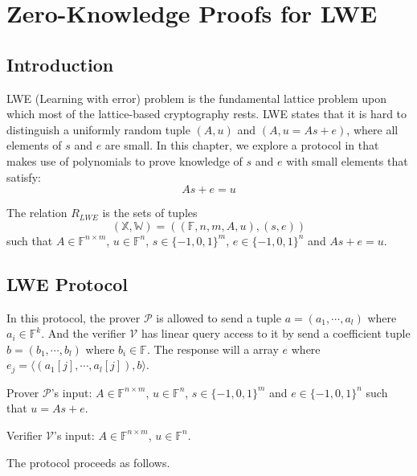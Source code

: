 \chapter{Zero-Knowledge Proofs for LWE}

\section{Introduction}

LWE (Learning with error) problem is the fundamental lattice problem upon which most of the lattice-based cryptography rests. LWE states that it is hard to distinguish a uniformly random tuple $(A, u)$ and $(A, u = As+e)$, where all elements of $s$ and $e$ are small. In this chapter, we explore a protocol in \cite{lwe} that makes use of polynomials to prove knowledge of $s$ and $e$ with small elements that satisfy:
$$
    As + e = u
$$

\begin{definition}
The relation $R_{LWE}$ is the sets of tuples
$$
    (\mathbb{X}, \mathbb{W}) = ((\mathbb{F}, n, m, A, u), (s, e))
$$ 
such that $A \in \mathbb{F}^{n \times m}$, $u \in \mathbb{F}^{n}$, $s \in \{-1, 0, 1\}^{m}$, $e \in \{-1, 0, 1\}^{n}$ and $As + e = u$.
\end{definition}

\section{LWE Protocol}

In this protocol, the prover $\mathcal{P}$ is allowed to send a tuple $a = (a_1, \cdots, a_l)$ where $a_i \in \mathbb{F}^k$. And the verifier $\mathcal{V}$ has linear query access to it by send a coefficient tuple $b = (b_1, \cdots, b_l)$ where $b_i \in \mathbb{F}$. The response will a array $e$ where $e_j = \langle (a_1[j], \cdots, a_l[j]), b  \rangle$.

Prover $\mathcal{P}$'s input: $A \in \mathbb{F}^{n \times m}$, $u \in \mathbb{F}^{n}$, $s \in \{-1, 0, 1\}^{m}$ and $e \in \{-1, 0, 1\}^{n}$ such that $u = As + e$.

Verifier $\mathcal{V}$'s input: $A \in \mathbb{F}^{n \times m}$, $u \in \mathbb{F}^{n}$.

The protocol proceeds as follows.



